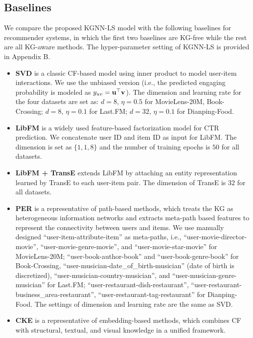 \documentclass[sigconf]{acmart}
\begin{document}
	\subsection{Baselines}
		We compare the proposed KGNN-LS model with the following baselines for recommender systems, in which the first two baselines are KG-free while the rest are all KG-aware methods.
		The hyper-parameter setting of KGNN-LS is provided in Appendix B.
		\begin{itemize}
			\item
				\textbf{SVD} \cite{koren2008factorization} is a classic CF-based model using inner product to model user-item interactions.
				We use the unbiased version (i.e., the predicted engaging probability is modeled as $y_{uv} = {\bf u}^\top {\bf v}$).
				The dimension and learning rate for the four datasets are set as: $d = 8$, $\eta = 0.5$ for MovieLens-20M, Book-Crossing; $d = 8$, $\eta = 0.1$ for Last.FM; $d = 32$, $\eta = 0.1$ for Dianping-Food.
			\item
				\textbf{LibFM} \cite{rendle2012factorization} is a widely used feature-based factorization model for CTR prediction.
				We concatenate user ID and item ID as input for LibFM.
				The dimension is set as $\{1, 1, 8\}$ and the number of training epochs is $50$ for all datasets.
			\item
				\textbf{LibFM + TransE} extends LibFM by attaching an entity representation learned by TransE \cite{bordes2013translating} to each user-item pair.
				The dimension of TransE is $32$ for all datasets.
			\item
				\textbf{PER} \cite{yu2014personalized} is a representative of path-based methods, which treats the KG as heterogeneous information networks and extracts meta-path based features to represent the connectivity between users and items.
				We use manually designed ``user-item-attribute-item'' as meta-paths, i.e., ``user-movie-director-movie'', ``user-movie-genre-movie'', and ``user-movie-star-movie'' for MovieLens-20M; ``user-book-author-book'' and ``user-book-genre-book'' for Book-Crossing, ``user-musician-date\_of\_birth-musician'' (date of birth is discretized), ``user-musician-country-musician'', and ``user-musician-genre-musician'' for Last.FM; ``user-restaurant-dish-restaurant'', ``user-restaurant-business\_area-restaurant'', ``user-restaurant-tag-restaurant'' for Dianping-Food.
				The settings of dimension and learning rate are the same as SVD.
			\item
				\textbf{CKE} \cite{zhang2016collaborative} is a representative of embedding-based methods, which combines CF with structural, textual, and visual knowledge in a unified framework.

\end{itemize}
\end{document}
